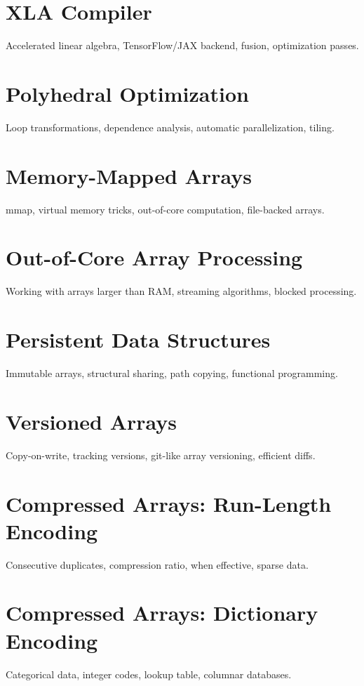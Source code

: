\chapter{XLA Compiler}
Accelerated linear algebra, TensorFlow/JAX backend, fusion, optimization passes.

\chapter{Polyhedral Optimization}
Loop transformations, dependence analysis, automatic parallelization, tiling.


\chapter{Memory-Mapped Arrays}
mmap, virtual memory tricks, out-of-core computation, file-backed arrays.

\chapter{Out-of-Core Array Processing}
Working with arrays larger than RAM, streaming algorithms, blocked processing.

\chapter{Persistent Data Structures}
Immutable arrays, structural sharing, path copying, functional programming.

\chapter{Versioned Arrays}
Copy-on-write, tracking versions, git-like array versioning, efficient diffs.

\chapter{Compressed Arrays: Run-Length Encoding}
Consecutive duplicates, compression ratio, when effective, sparse data.

\chapter{Compressed Arrays: Dictionary Encoding}
Categorical data, integer codes, lookup table, columnar databases.

